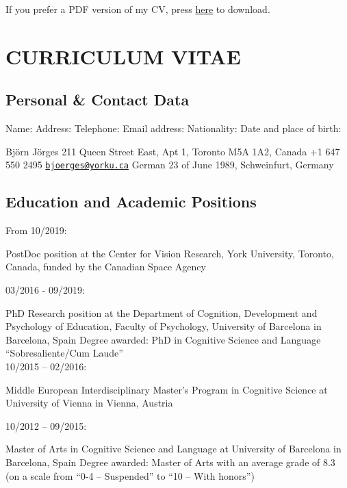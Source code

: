 \documentclass[]{article}
\title{}
\author{}
\date{}
\begin{document}
{
\setcounter{tocdepth}{2}
\tableofcontents
}
If you prefer a PDF version of my CV, press
\href{https://github.com/b-jorges/rmarkdown-website-tutorial/raw/gh-pages/CV.pdf}{here}
to download.

\hypertarget{curriculum-vitae}{%
\section{CURRICULUM VITAE}\label{curriculum-vitae}}

\hypertarget{personal-contact-data}{%
\subsection{Personal \& Contact Data}\label{personal-contact-data}}

Name: Address: Telephone: Email address: Nationality: Date and place of
birth:

Björn Jörges 211 Queen Street East, Apt 1, Toronto M5A 1A2, Canada +1
647 550 2495
\href{mailto:bjoerges@yorku.ca}{\nolinkurl{bjoerges@yorku.ca}} German 23
of June 1989, Schweinfurt, Germany

\hypertarget{education-and-academic-positions}{%
\subsection{Education and Academic
Positions}\label{education-and-academic-positions}}

From 10/2019:

PostDoc position at the Center for Vision Research, York University,
Toronto, Canada, funded by the Canadian Space Agency

03/2016 - 09/2019:

PhD Research position at the Department of Cognition, Development and
Psychology of Education, Faculty of Psychology, University of Barcelona
in Barcelona, Spain Degree awarded: PhD in Cognitive Science and
Language ``Sobresaliente/Cum Laude''\\

10/2015 -- 02/2016:

Middle European Interdisciplinary Master's Program in Cognitive Science
at University of Vienna in Vienna, Austria

10/2012 -- 09/2015:

Master of Arts in Cognitive Science and Language at University of
Barcelona in Barcelona, Spain Degree awarded: Master of Arts with an
average grade of 8.3 (on a scale from ``0-4 -- Suspended'' to ``10 --
With honors'')
\end{document}
